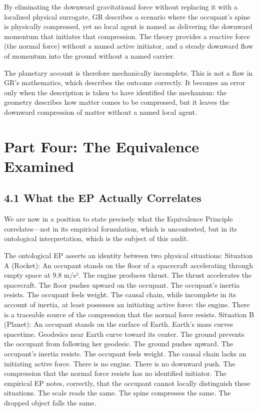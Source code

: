 \documentclass[11pt]{article}
\begin{document}
By eliminating the downward gravitational force without replacing it with a localized physical surrogate, GR describes a scenario where the occupant's spine is physically compressed, yet no local agent is named as delivering the downward momentum that initiates that compression. The theory provides a reactive force (the normal force) without a named active initiator, and a steady downward flow of momentum into the ground without a named carrier.

The planetary account is therefore mechanically incomplete. This is not a flaw in GR's mathematics, which describes the outcome correctly. It becomes an error only when the description is taken to have identified the mechanism: the geometry describes how matter comes to be compressed, but it leaves the downward compression of matter without a named local agent.

\section{Part Four: The Equivalence Examined}

\subsection{4.1 What the EP Actually Correlates}

We are now in a position to state precisely what the Equivalence Principle correlates---not in its empirical formulation, which is uncontested, but in its ontological interpretation, which is the subject of this audit.

The ontological EP asserts an identity between two physical situations: Situation A (Rocket): An occupant stands on the floor of a spacecraft accelerating through empty space at 9.8 m/s². The engine produces thrust. The thrust accelerates the spacecraft. The floor pushes upward on the occupant. The occupant's inertia resists. The occupant feels weight. The causal chain, while incomplete in its account of inertia, at least possesses an initiating active force: the engine. There is a traceable source of the compression that the normal force resists. Situation B (Planet): An occupant stands on the surface of Earth. Earth's mass curves spacetime. Geodesics near Earth curve toward its center. The ground prevents the occupant from following her geodesic. The ground pushes upward. The occupant's inertia resists. The occupant feels weight. The causal chain lacks an initiating active force. There is no engine. There is no downward push. The compression that the normal force resists has no identified initiator. The empirical EP notes, correctly, that the occupant cannot locally distinguish these situations. The scale reads the same. The spine compresses the same. The dropped object falls the same.
\end{document}
